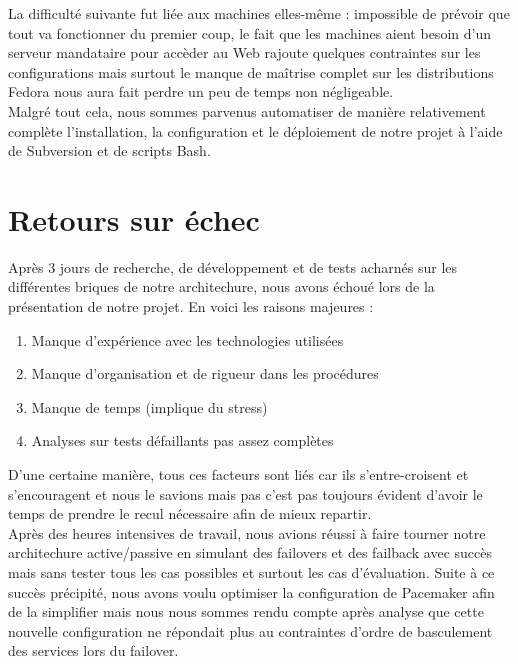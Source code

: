 \documentclass[11pt,a4paper]{report}
\begin{document}
            La difficulté suivante fut liée aux machines elles-même : impossible de prévoir que tout va fonctionner du premier coup, le fait que les machines aient besoin d'un serveur mandataire pour accèder au Web rajoute quelques contraintes sur les configurations mais surtout le manque de maîtrise complet sur les distributions Fedora nous aura fait perdre un peu de temps non négligeable.\\
            
            Malgré tout cela, nous sommes parvenus automatiser de manière relativement complète l'installation, la configuration et le déploiement de notre projet à l'aide de Subversion et de scripts Bash.
        
        \section{Retours sur échec}
        
            Après 3 jours de recherche, de développement et de tests acharnés sur les différentes briques de notre architechure, nous avons échoué lors de la présentation de notre projet. En voici les raisons majeures :\\
            
            \begin{enumerate}
                \item Manque d'expérience avec les technologies utilisées
                \item Manque d'organisation et de rigueur dans les procédures
                \item Manque de temps (implique du stress)
                \item Analyses sur tests défaillants pas assez complètes
            \end{enumerate}
            
            D'une certaine manière, tous ces facteurs sont liés car ils s'entre-croisent et s'encouragent et nous le savions mais pas c'est pas toujours évident d'avoir le temps de prendre le recul nécessaire afin de mieux repartir.\\
            
            Après des heures intensives de travail, nous avions réussi à faire tourner notre architechure active/passive en simulant des failovers et des failback avec succès mais sans tester tous les cas possibles et surtout les cas d'évaluation. Suite à ce succès précipité, nous avons voulu optimiser la configuration de Pacemaker afin de la simplifier mais nous nous sommes rendu compte après analyse que cette nouvelle configuration ne répondait plus au contraintes d'ordre de basculement des services lors du failover.
            
\end{document}
